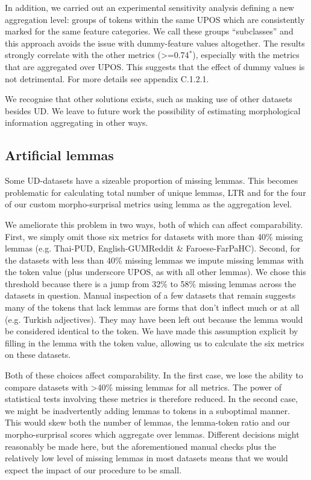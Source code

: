 \documentclass[USenglish]{article}
\begin{document}
In addition, we carried out an experimental sensitivity analysis defining a new aggregation level: groups of tokens within the same UPOS which are consistently marked for the same feature categories. 
We call these groups ``subclasses'' and this approach avoids the issue with dummy-feature values altogether. 
The results strongly correlate with the other metrics (>=0.74$^*$), especially with the metrics that are aggregated over UPOS. 
This suggests that the effect of dummy values is not detrimental.
For more details see appendix C.1.2.1.

We recognise that other solutions exists, such as making use of other datasets besides UD.
We leave to future work the possibility of estimating morphological information aggregating in other ways.

\subsection{Artificial lemmas}

Some UD-datasets have a sizeable proportion of missing lemmas.
This becomes problematic for calculating total number of unique lemmas, LTR and for the four of our custom morpho-surprisal metrics using lemma as the aggregation level.

We ameliorate this problem in two ways, both of which can affect comparability.
First, we simply omit those six metrics for datasets with more than 40\% missing lemmas (e.g. Thai-PUD, English-GUMReddit \& Faroese-FarPaHC).
Second, for the datasets with less than 40\% missing lemmas we impute missing lemmas with the token value (plus underscore UPOS, as with all other lemmas).
We chose this threshold because there is a jump from 32\% to 58\% missing lemmas across the datasets in question.
Manual inspection of a few  datasets that remain suggests many of the tokens that lack lemmas are forms that don't inflect much or at all (e.g. Turkish adjectives).
They may have been left out because the lemma would be considered identical to the token.
We have made this assumption explicit by filling in the lemma with the token value, allowing us to calculate the six metrics on these datasets.

Both of these choices affect comparability.
In the first case, we lose the ability to compare datasets with >40\% missing lemmas for all metrics. 
The power of statistical tests involving these metrics is therefore reduced.
In the second case, we might be inadvertently adding lemmas to tokens in a suboptimal manner.
This would skew both the number of lemmas, the lemma-token ratio and our morpho-surprisal scores which aggregate over lemmas.
Different decisions might reasonably be made here, but the aforementioned manual checks plus the relatively low level of missing lemmas in most datasets means that we would expect the impact of our procedure to be small.
\end{document}
